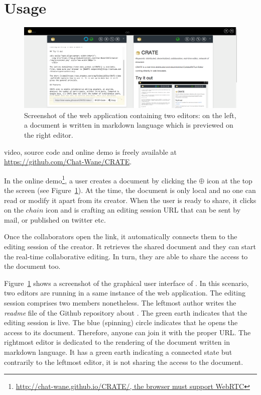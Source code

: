 
\section{Usage}
\label{sec:usage}

\begin{figure}
  \includegraphics[width=\textwidth]{./img/crate2.png}
  \caption{\label{img:screenshot} Screenshot of the web application containing
    two editors: on the left, a document is written in markdown language which
    is previewed on the right editor.}
\end{figure}

\CRATE video, source code and online demo is freely available at
\url{https://github.com/Chat-Wane/CRATE}.


In the online demo\footnote{\url{http://chat-wane.github.io/CRATE/, the
    browser must support WebRTC}}, a user creates a document by
clicking the $\oplus$ icon at the top the screen (see
Figure~\ref{img:screenshot}). At the time, the document is only local
and no one can read or modify it apart from its creator. When the user
is ready to share, it clicks on the $chain$ icon and \CRATE is
crafting an editing session URL that can be sent by mail, or published
on twitter etc.

Once the collaborators open the link, it automatically connects them
to the editing session of the creator. It retrieves the shared
document and they can start the real-time collaborative editing. In
turn, they are able to share the access to the document too. 

Figure~\ref{img:screenshot} shows a screenshot of the graphical user interface
of \CRATE. In this scenario, two editors are running in a same instance of the
web application. The editing session comprises two members nonetheless. The
leftmost author writes the \emph{readme} file of the Github repository about
\CRATE. The green earth indicates that the editing session is live. The blue
(spinning) circle indicates that he opens the access to its document. Therefore,
anyone can join it with the proper URL. The rightmost editor is dedicated to the
rendering of the document written in markdown language. It has a green earth
indicating a connected state but contrarily to the leftmost editor, it is not
sharing the access to the document.

